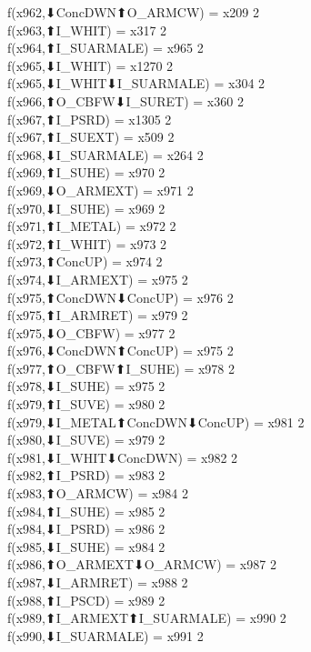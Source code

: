 f(x962,⬇ConcDWN⬆O_ARMCW) = x209 {2} \\
f(x963,⬆I_WHIT) = x317 {2} \\
f(x964,⬆I_SUARMALE) = x965 {2} \\
f(x965,⬇I_WHIT) = x1270 {2} \\
f(x965,⬇I_WHIT⬇I_SUARMALE) = x304 {2} \\
f(x966,⬆O_CBFW⬇I_SURET) = x360 {2} \\
f(x967,⬆I_PSRD) = x1305 {2} \\
f(x967,⬆I_SUEXT) = x509 {2} \\
f(x968,⬇I_SUARMALE) = x264 {2} \\
f(x969,⬆I_SUHE) = x970 {2} \\
f(x969,⬇O_ARMEXT) = x971 {2} \\
f(x970,⬇I_SUHE) = x969 {2} \\
f(x971,⬆I_METAL) = x972 {2} \\
f(x972,⬆I_WHIT) = x973 {2} \\
f(x973,⬆ConcUP) = x974 {2} \\
f(x974,⬇I_ARMEXT) = x975 {2} \\
f(x975,⬆ConcDWN⬇ConcUP) = x976 {2} \\
f(x975,⬆I_ARMRET) = x979 {2} \\
f(x975,⬇O_CBFW) = x977 {2} \\
f(x976,⬇ConcDWN⬆ConcUP) = x975 {2} \\
f(x977,⬆O_CBFW⬆I_SUHE) = x978 {2} \\
f(x978,⬇I_SUHE) = x975 {2} \\
f(x979,⬆I_SUVE) = x980 {2} \\
f(x979,⬇I_METAL⬆ConcDWN⬇ConcUP) = x981 {2} \\
f(x980,⬇I_SUVE) = x979 {2} \\
f(x981,⬇I_WHIT⬇ConcDWN) = x982 {2} \\
f(x982,⬆I_PSRD) = x983 {2} \\
f(x983,⬆O_ARMCW) = x984 {2} \\
f(x984,⬆I_SUHE) = x985 {2} \\
f(x984,⬇I_PSRD) = x986 {2} \\
f(x985,⬇I_SUHE) = x984 {2} \\
f(x986,⬆O_ARMEXT⬇O_ARMCW) = x987 {2} \\
f(x987,⬇I_ARMRET) = x988 {2} \\
f(x988,⬆I_PSCD) = x989 {2} \\
f(x989,⬆I_ARMEXT⬆I_SUARMALE) = x990 {2} \\
f(x990,⬇I_SUARMALE) = x991 {2} \\
